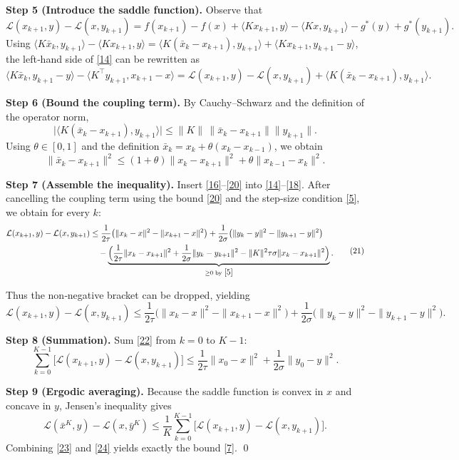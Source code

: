 \documentclass{article}
\newcommand{\inner}[2]{\langle #1,#2\rangle}
\newcommand{\norm}[1]{\|#1\|}
\begin{document}
\medskip
\noindent\textbf{Step 5 (Introduce the saddle function).}  
Observe that
\[
\mathcal{L}(x_{k+1},y)-\mathcal{L}(x,y_{k+1})
= f(x_{k+1})-f(x)+\inner{Kx_{k+1}}{y}-\inner{Kx}{y_{k+1}}-g^{*}(y)+g^{*}(y_{k+1}).
\tag{17}
\]
Using $\inner{K\bar x_{k}}{y_{k+1}}-\inner{Kx_{k+1}}{y}
= \inner{K(\bar x_{k}-x_{k+1})}{y_{k+1}}+\inner{Kx_{k+1}}{y_{k+1}-y}$,
the left‑hand side of \eqref{14} can be rewritten as
\[
\inner{K\bar x_{k}}{y_{k+1}-y}-\inner{K^{\top}y_{k+1}}{x_{k+1}-x}
= \mathcal{L}(x_{k+1},y)-\mathcal{L}(x,y_{k+1})
+\inner{K(\bar x_{k}-x_{k+1})}{y_{k+1}}.
\tag{18}
\]

\medskip
\noindent\textbf{Step 6 (Bound the coupling term).}  
By Cauchy–Schwarz and the definition of the operator norm,
\[
\bigl|\inner{K(\bar x_{k}-x_{k+1})}{y_{k+1}}\bigr|
\le \|K\|\,\norm{\bar x_{k}-x_{k+1}}\norm{y_{k+1}}.
\tag{19}
\]
Using $\theta\in[0,1]$ and the definition $\bar x_{k}=x_{k}+\theta(x_{k}-x_{k-1})$, we obtain
\[
\norm{\bar x_{k}-x_{k+1}}^{2}
\le (1+\theta)\norm{x_{k}-x_{k+1}}^{2}+\theta\norm{x_{k-1}-x_{k}}^{2}.
\tag{20}
\]

\medskip
\noindent\textbf{Step 7 (Assemble the inequality).}  
Insert \eqref{16}–\eqref{20} into \eqref{14}–\eqref{18}. After cancelling the coupling term using the bound \eqref{20} and the step‑size condition \eqref{5}, we obtain for every $k$:
\[
\begin{aligned}
\mathcal{L}(x_{k+1},y)-\mathcal{L}(x,y_{k+1})
&\le
\frac{1}{2\tau}\bigl(\norm{x_{k}-x}^{2}-\norm{x_{k+1}-x}^{2}\bigr)
+\frac{1}{2\sigma}\bigl(\norm{y_{k}-y}^{2}-\norm{y_{k+1}-y}^{2}\bigr)\\
&\quad -\underbrace{\Bigl(\frac{1}{2\tau}\norm{x_{k}-x_{k+1}}^{2}
+\frac{1}{2\sigma}\norm{y_{k}-y_{k+1}}^{2}
-\|K\|^{2}\tau\sigma\norm{x_{k}-x_{k+1}}^{2}\Bigr)}_{\ge 0\;\text{by }\eqref{5}} .
\end{aligned}
\tag{21}
\]

Thus the non‑negative bracket can be dropped, yielding
\[
\mathcal{L}(x_{k+1},y)-\mathcal{L}(x,y_{k+1})
\le
\frac{1}{2\tau}\bigl(\norm{x_{k}-x}^{2}-\norm{x_{k+1}-x}^{2}\bigr)
+\frac{1}{2\sigma}\bigl(\norm{y_{k}-y}^{2}-\norm{y_{k+1}-y}^{2}\bigr).
\tag{22}
\]

\medskip
\noindent\textbf{Step 8 (Summation).}  
Sum \eqref{22} from $k=0$ to $K-1$:
\[
\sum_{k=0}^{K-1}\bigl[\mathcal{L}(x_{k+1},y)-\mathcal{L}(x,y_{k+1})\bigr]
\le
\frac{1}{2\tau}\norm{x_{0}-x}^{2}
+\frac{1}{2\sigma}\norm{y_{0}-y}^{2}.
\tag{23}
\]

\medskip
\noindent\textbf{Step 9 (Ergodic averaging).}  
Because the saddle function is convex in $x$ and concave in $y$, Jensen's inequality gives
\[
\mathcal{L}(\bar x^{K},y)-\mathcal{L}(x,\bar y^{K})
\le
\frac{1}{K}\sum_{k=0}^{K-1}\bigl[\mathcal{L}(x_{k+1},y)-\mathcal{L}(x,y_{k+1})\bigr].
\tag{24}
\]
Combining \eqref{23} and \eqref{24} yields exactly the bound \eqref{7}. \qed
\end{document}
